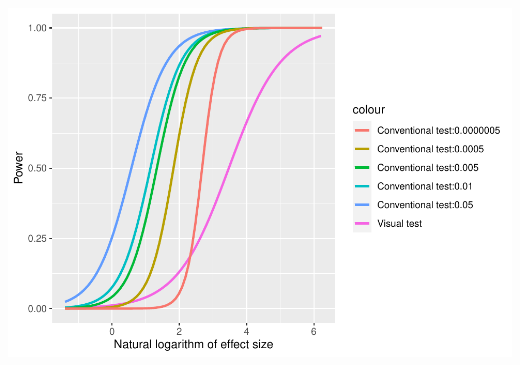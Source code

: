 \documentclass[]{interact}
\theoremstyle{plain}%
\theoremstyle{definition}
\theoremstyle{remark}
\begin{document}
\includegraphics{paper_comparison_files/figure-latex/unnamed-chunk-11-1.pdf}



\end{document}
